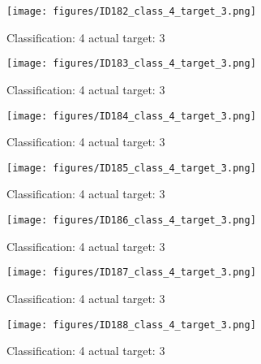 \begin{figure}[h!]
\begin{center}
\texttt{[image: figures/ID182\_class\_4\_target\_3.png]}
\end{center}
\caption{ Classification: 4 actual target: 3}
\label{fig:ID182_class_4_target_3}
\end{figure}
\begin{figure}[h!]
\begin{center}
\texttt{[image: figures/ID183\_class\_4\_target\_3.png]}
\end{center}
\caption{ Classification: 4 actual target: 3}
\label{fig:ID183_class_4_target_3}
\end{figure}
\begin{figure}[h!]
\begin{center}
\texttt{[image: figures/ID184\_class\_4\_target\_3.png]}
\end{center}
\caption{ Classification: 4 actual target: 3}
\label{fig:ID184_class_4_target_3}
\end{figure}
\begin{figure}[h!]
\begin{center}
\texttt{[image: figures/ID185\_class\_4\_target\_3.png]}
\end{center}
\caption{ Classification: 4 actual target: 3}
\label{fig:ID185_class_4_target_3}
\end{figure}
\begin{figure}[h!]
\begin{center}
\texttt{[image: figures/ID186\_class\_4\_target\_3.png]}
\end{center}
\caption{ Classification: 4 actual target: 3}
\label{fig:ID186_class_4_target_3}
\end{figure}
\begin{figure}[h!]
\begin{center}
\texttt{[image: figures/ID187\_class\_4\_target\_3.png]}
\end{center}
\caption{ Classification: 4 actual target: 3}
\label{fig:ID187_class_4_target_3}
\end{figure}
\begin{figure}[h!]
\begin{center}
\texttt{[image: figures/ID188\_class\_4\_target\_3.png]}
\end{center}
\caption{ Classification: 4 actual target: 3}
\label{fig:ID188_class_4_target_3}
\end{figure}
